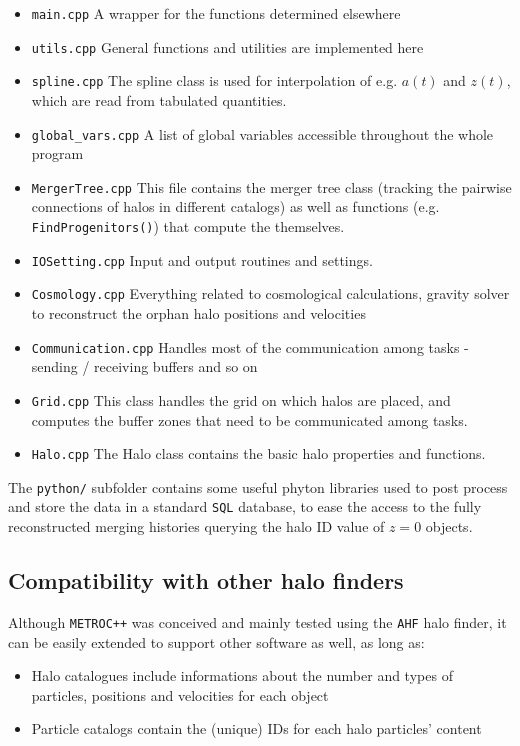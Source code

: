 \documentclass{article}
\begin{document}
\begin{itemize}
\item{\texttt{main.cpp}} A wrapper for the functions determined elsewhere
\item{\texttt{utils.cpp}} General functions and utilities are implemented here
\item{\texttt{spline.cpp}} The spline class is used for interpolation of e.g. $a(t)$ and $z(t)$, which are
read from tabulated quantities.
\item{\texttt{global\_vars.cpp}} A list of global variables accessible throughout the whole program
\item{\texttt{MergerTree.cpp}} This file contains the merger tree class (tracking the pairwise connections of 
halos in different catalogs) as well as functions (e.g. \texttt{FindProgenitors()}) 
that compute the  themselves.
\item{\texttt{IOSetting.cpp}} Input and output routines and settings.
\item{\texttt{Cosmology.cpp}} Everything related to cosmological calculations, gravity solver to reconstruct the orphan halo 
positions and velocities 
\item{\texttt{Communication.cpp}} Handles most of the communication among tasks - sending / receiving buffers and so on
\item{\texttt{Grid.cpp}} This class handles the grid on which halos are placed, and computes the buffer zones that need to 
be communicated among tasks. 
\item{\texttt{Halo.cpp}} The Halo class contains the basic halo properties and functions.
\end{itemize}

The \texttt{python/} subfolder contains some useful phyton libraries used to post process and store the data in 
a standard \texttt{SQL} database, to ease the access to the fully reconstructed merging histories querying the 
halo ID value of $z=0$ objects.


\subsection{Compatibility with other halo finders}
Although \texttt{METROC++} was conceived and mainly tested using the \texttt{AHF} halo finder, it can be easily extended to 
support other software as well, as long as:

\begin{itemize}
\item Halo catalogues include informations about the number and types of particles, positions and velocities for each object
\item Particle catalogs contain the (unique) IDs for each halo particles' content
\end{itemize}
\end{document}
